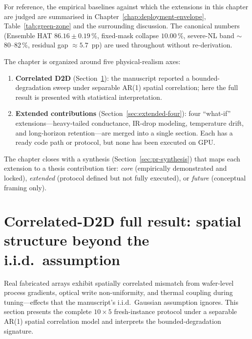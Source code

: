 For reference, the empirical baselines against which the extensions in this chapter are judged are summarised in Chapter~\ref{chap:deployment-envelope}, Table~\ref{tab:green-zone} and the surrounding discussion.  The canonical numbers (Ensemble HAT $86.16\pm0.19\,\%$, fixed-mask collapse $10.00\,\%$, severe-NL band $\sim$80--82\,\%, residual gap $\approx 5.7$~pp) are used throughout without re-derivation.

The chapter is organized around five physical-realism axes:
\begin{enumerate}
    \item \textbf{Correlated D2D} (Section~\ref{sec:correlated-d2d-full}): the manuscript reported a bounded-degradation sweep under separable AR(1) spatial correlation; here the full result is presented with statistical interpretation.
    \item \textbf{Extended contributions} (Section~\ref{sec:extended-four}): four ``what-if'' extensions---heavy-tailed conductance, IR-drop modeling, temperature drift, and long-horizon retention---are merged into a single section.  Each has a ready code path or protocol, but none has been executed on GPU.
\end{enumerate}

The chapter closes with a synthesis (Section~\ref{sec:pr-synthesis}) that maps each extension to a thesis contribution tier: \emph{core} (empirically demonstrated and locked), \emph{extended} (protocol defined but not fully executed), or \emph{future} (conceptual framing only).


\section{Correlated-D2D full result: spatial structure beyond the i.i.d.~assumption}
\label{sec:correlated-d2d-full}

Real fabricated arrays exhibit spatially correlated mismatch from wafer-level process gradients, optical write non-uniformity, and thermal coupling during tuning---effects that the manuscript's i.i.d.~Gaussian assumption ignores.  This section presents the complete $10 \times 5$ fresh-instance protocol under a separable AR(1) spatial correlation model and interprets the bounded-degradation signature.

